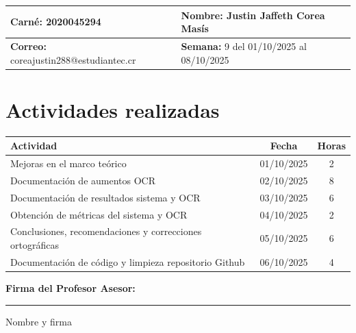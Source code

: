 \documentclass[12pt,a4paper]{article}
\begin{document}
\noindent
\begin{tabularx}{\textwidth}{|X|X|}
\hline
\textbf{Carné:} 2020045294 & \textbf{Nombre:} Justin Jaffeth Corea Masís \\
\hline
\textbf{Correo:} coreajustin288@estudiantec.cr & \textbf{Semana:} 9 del 01/10/2025 al 08/10/2025 \\
\hline
\end{tabularx}

\vspace{0.5cm}

\section*{Actividades realizadas}

\begin{tabularx}{\textwidth}{|>{\raggedright\arraybackslash}p{12cm}|c|c|}
\hline
\textbf{Actividad} & \textbf{Fecha} & \textbf{Horas} \\
\hline
Mejoras en el marco teórico & 01/10/2025 & 2 \\
\hline
Documentación de aumentos OCR & 02/10/2025 & 8 \\
\hline
Documentación de resultados sistema y OCR & 03/10/2025 & 6 \\
\hline
Obtención de métricas del sistema y OCR & 04/10/2025 & 2 \\
\hline
Conclusiones, recomendaciones y correcciones ortográficas & 05/10/2025 & 6 \\
\hline
Documentación de código y limpieza repositorio Github & 06/10/2025 & 4 \\
\hline
\end{tabularx}

\vspace{1cm}

\noindent
\textbf{Firma del Profesor Asesor:}

\vspace{2cm}

\noindent\rule{8cm}{0.4pt}  
Nombre y firma
\end{document}
